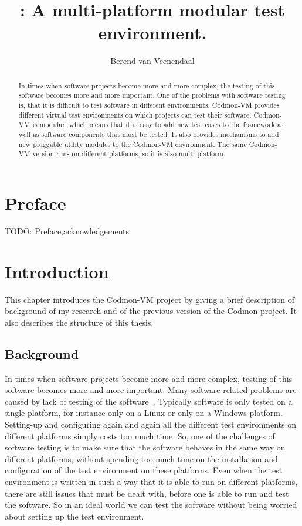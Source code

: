 \documentclass{article}
\title{\project{}: A multi-platform modular test environment.}
\author{Berend van Veenendaal}
\newcommand{\project}{Codmon-VM}
\begin{document}
\maketitle

\begin{abstract}
In times when software projects become more and more complex, the testing of this software becomes more and more important. One of the problems with software testing is, that it is difficult to test software in 
different environments. \project{} provides different virtual test environments on which projects can test their software. \project{} is modular, which means that it is easy to add new test cases to the framework 
as well as software components that must be tested. It also provides mechanisms to add new pluggable utility modules to the \project{} environment. The same \project{} version runs on different platforms, so it 
is also multi-platform.
\end{abstract}
\newpage
\section*{Preface}
\label{sec:Preface}
TODO: Preface,acknowledgements
\newpage
\tableofcontents
\newpage

\section{Introduction}
\label{sec:Introduction}
This chapter introduces the \project{} project by giving a brief description of background of my research and of the
previous version of the Codmon project. It also describes the structure of this thesis.

\subsection{Background}
\label{sec:Background}
In times when software projects become more and more complex, testing of this software becomes more and more important. Many software related problems are caused by lack of testing of the 
software~\cite{TTCST}. Typically software is only tested on a single platform, for instance only on a Linux or only on a Windows platform. Setting-up and configuring again and again all 
the different test environments on different platforms simply costs too much time. So, one of the challenges of software testing is to make sure that the software behaves in the same way on 
different platforms, without spending too much time on the installation and configuration of the test environment on these platforms. Even when the test environment is written in such a way 
that it is able to run on different platforms, there are still issues that must be dealt with, before one is able to run and test the software. So in an ideal world we can test the software without being 
worried about setting up the test environment. 
\end{document}
